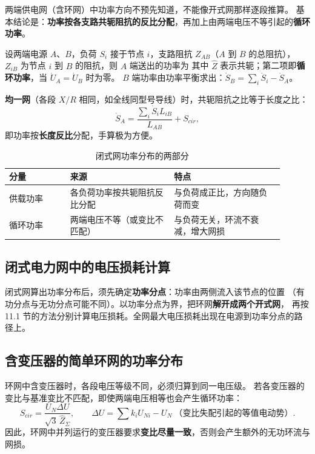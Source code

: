 两端供电网（含环网）中功率方向不预先知道，不能像开式网那样逐段推算。
基本结论是：\textbf{功率按各支路共轭阻抗的反比分配}，再加上由两端电压不等引起的\textbf{循环功率}。

设两端电源 $A$、$B$，负荷 $S_i$ 接于节点 $i$，支路阻抗 $Z_{AB}$（$A$ 到 $B$ 的总阻抗），
$Z_{iB}$ 为节点 $i$ 到 $B$ 的阻抗，则 $A$ 端送出的功率为
其中 $\hat Z$ 表示共轭；第二项即\textbf{循环功率}，当 $\dot U_A=\dot U_B$ 时为零。
$B$ 端功率由功率平衡求出：$\dot S_B=\sum_i\dot S_i-\dot S_A$。

\textbf{均一网}（各段 $X/R$ 相同，如全线同型号导线）时，共轭阻抗之比等于长度之比：
\begin{equation}
  \dot S_A=\frac{\sum_i\dot S_iL_{iB}}{L_{AB}}+S_{cir},
\end{equation}
即功率按\textbf{长度反比}分配，手算极为方便。

\begin{table}[htbp]
  \centering
  \caption{闭式网功率分布的两部分}
  \small
  \begin{tabular}{@{}p{0.20\linewidth}p{0.34\linewidth}p{0.36\linewidth}@{}}
    \toprule
    分量 & 来源 & 特点 \\
    \midrule
    供载功率 & 各负荷功率按共轭阻抗反比分配 & 与负荷成正比，方向随负荷而变 \\
    循环功率 & 两端电压不等（或变比不匹配） & 与负荷无关，环流不衰减，增大网损 \\
    \bottomrule
  \end{tabular}
\end{table}

\subsection{闭式电力网中的电压损耗计算}

闭式网算出功率分布后，须先确定\textbf{功率分点}：功率由两侧流入该节点的位置
（有功分点与无功分点可能不同）。以功率分点为界，把环网\textbf{解开成两个开式网}，
再按 11.1 节的方法分别计算电压损耗。全网最大电压损耗出现在电源到功率分点的路径上。

\subsection{含变压器的简单环网的功率分布}

环网中含变压器时，各段电压等级不同，必须归算到同一电压级。
若各变压器的变比与基准变比不匹配，即使两端电压相等也会产生循环功率：
\begin{equation}
  S_{cir}=\frac{U_N\Delta U}{\sqrt{3}\,\hat Z_{\Sigma}},
  \qquad \Delta U=\sum k_iU_{Ni}-U_N\ \text{（变比失配引起的等值电动势）}.
\end{equation}
因此，环网中并列运行的变压器要求\textbf{变比尽量一致}，否则会产生额外的无功环流与网损。

